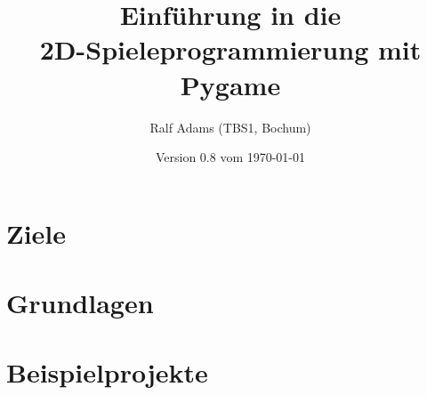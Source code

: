 \documentclass[a4paper,12pt,twoside]{scrreprt}
\begin{document}
  \title{Einführung in die\\2D-Spieleprogrammierung mit Pygame}
  \author{Ralf Adams (TBS1, Bochum)}
  \date{Version 0.8 vom \today}
  \maketitle
  \tableofcontents

\setlength{\parindent}{0.0em}
\setlength{\parskip}{1.0ex plus0.5ex minus0.5ex}
\setlength{\itemsep}{-0.3ex plus0.2ex}


\chapter{Ziele}
\chapter{Grundlagen}\label{secGrundlagen}















\chapter{Beispielprojekte}


%

\listoffigures

\printglossaries
\printindex
{}
\end{document}
